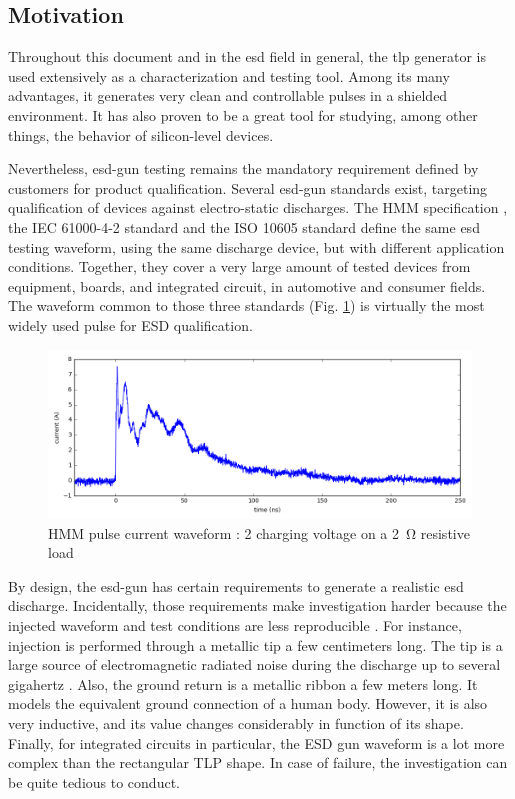 \subsection{Motivation}

Throughout this document and in the \gls{esd} field in general, the \gls{tlp} generator is used extensively as a characterization and testing tool.
Among its many advantages, it generates very clean and controllable pulses in a shielded environment.
It has also proven to be a great tool for studying, among other things, the behavior of silicon-level devices.

Nevertheless, \gls{esd-gun} testing remains the mandatory requirement defined by customers for product qualification.
Several \gls{esd-gun} standards exist, targeting qualification of devices against electro-static discharges.
The HMM specification \cite{hmm}, the IEC 61000-4-2 standard \cite{iec61000-4-2} and the ISO 10605 standard \cite{iso10605} define the same \gls{esd} testing waveform, using the same discharge device, but with different application conditions.
Together, they cover a very large amount of tested devices from equipment, boards, and integrated circuit, in automotive and consumer fields.
The waveform common to those three standards (Fig. \ref{fig:hmm-waveform}) is virtually the most widely used pulse for ESD qualification.

\begin{figure}[!h]
  \centering
  \includegraphics[width=\textwidth]{src/5/figures/hmm_pulse.png}
  \caption{HMM pulse current waveform : \SI{2}{\kilo}{\volt} charging voltage on a \SI{2}{\ohm} resistive load}
  \label{fig:hmm-waveform}
\end{figure}

By design, the \gls{esd-gun} has certain requirements to generate a realistic \gls{esd} discharge.
Incidentally, those requirements make investigation harder because the injected waveform and test conditions are less reproducible \cite{hmm-round-robin-study}.
For instance, injection is performed through a metallic tip a few centimeters long.
The tip is a large source of electromagnetic radiated noise during the discharge up to several gigahertz \cite{system-level-esd-failure-variation}.
Also, the ground return is a metallic ribbon a few meters long.
It models the equivalent ground connection of a human body.
However, it is also very inductive, and its value changes considerably in function of its shape.
Finally, for integrated circuits in particular, the ESD gun waveform is a lot more complex than the rectangular TLP shape.
In case of failure, the investigation can be quite tedious to conduct.


